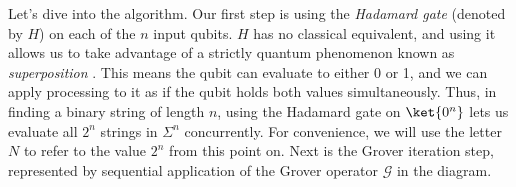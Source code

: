 Let's dive into the algorithm. Our first step is using the \emph{Hadamard gate} (denoted by $H$) \cite{quantumgates} on each of the $n$ input qubits. $H$ has no classical equivalent, and using it allows us to take advantage of a strictly quantum phenomenon known as \emph{superposition} \cite{superposition}. This means the qubit can evaluate to either 0 or 1, and we can apply processing to it as if the qubit holds both values simultaneously. Thus, in finding a binary string of length $n$, using the Hadamard gate on $\ket{0^{n}}$ lets us evaluate all $2^n$ strings in $\Sigma^n$ concurrently. For convenience, we will use the letter $N$ to refer to the value $2^n$ from this point on. Next is the Grover iteration step, represented by sequential application of the Grover operator $\mathcal{G}$ in the diagram.
